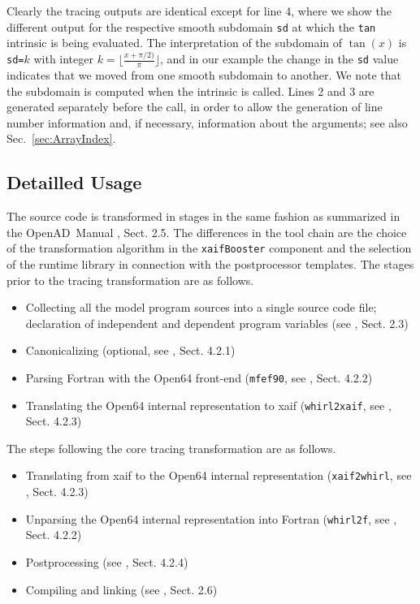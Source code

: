 \documentclass{article}
\newcommand{\openad}{OpenAD}
\newcommand{\refsec}[1]{{Sec.~\ref{#1}}}
\begin{document}
Clearly the tracing outputs are identical except for line 4, where we show the 
different output for the respective smooth subdomain \lstinline{sd} at which the 
\lstinline{tan} intrinsic is being evaluated. The interpretation of the subdomain of $\tan(x)$ 
is \lstinline{sd=}$k$ with integer $k=\lfloor\frac{x+\pi/2)}{\pi}\rfloor$, and in our 
example the change in the \lstinline{sd} value  indicates that we moved from one smooth 
subdomain to another. 
We note that the subdomain is computed when the intrinsic is called. Lines 2 and 3 
are generated separately before the call, in order to allow the generation of line number information 
and, if necessary,  information about the arguments; see also \refsec{sec:ArrayIndex}.

\subsection{Detailled Usage}
The source code is transformed in stages in the same fashion as 
summarized in the \openad\ Manual \cite{userManual}, Sect. 2.5. 
The differences in the tool chain are the choice of the transformation algorithm 
in the \lstinline{xaifBooster} component and the selection of the runtime library in connection with 
the postprocessor templates. 
The stages prior to the tracing transformation are as follows.
\begin{itemize}
\item Collecting all the model program sources into a  single source code file; declaration of independent and dependent program variables (see \cite{userManual}, Sect. 2.3)
\item Canonicalizing (optional, see \cite{userManual}, Sect. 4.2.1)
\item Parsing Fortran with the Open64 front-end (\lstinline{mfef90}, see \cite{userManual}, Sect. 4.2.2)
\item Translating the Open64 internal representation to xaif (\lstinline{whirl2xaif}, see \cite{userManual}, Sect. 4.2.3)
\end{itemize}
The steps following the core tracing transformation are as follows.
\begin{itemize}
\item Translating from xaif to the Open64 internal representation (\lstinline{xaif2whirl}, see \cite{userManual}, Sect. 4.2.3)
\item Unparsing the Open64 internal representation into Fortran (\lstinline{whirl2f}, see \cite{userManual}, Sect. 4.2.2)
\item Postprocessing (see \cite{userManual}, Sect. 4.2.4)
\item Compiling and linking (see \cite{userManual}, Sect. 2.6)
\end{itemize}
\end{document}
